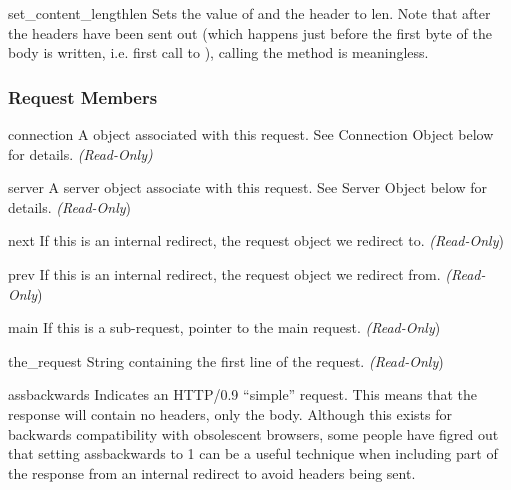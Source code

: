 \begin{methoddesc}[request]{set_content_length}{len}
  Sets the value of  and the 
  header to len. Note that after the headers have been sent out (which
  happens just before the first byte of the body is written,
  i.e. first call to ), calling the method is
  meaningless.
\end{methoddesc}


\subsubsection{Request Members\label{pyapi-mprequest-mem}}

\begin{memberdesc}[request]{connection}
  A  object associated with this request. See
  Connection Object below for details.
  \emph{(Read-Only)}
\end{memberdesc}

\begin{memberdesc}[request]{server}
  A server object associate with this request. See Server Object below
  for details.
  \emph{(Read-Only})
\end{memberdesc}

\begin{memberdesc}[request]{next}
  If this is an internal redirect, the request object we redirect to. 
  \emph{(Read-Only})
\end{memberdesc}

\begin{memberdesc}[request]{prev}
  If this is an internal redirect, the request object we redirect from.
  \emph{(Read-Only})
\end{memberdesc}

\begin{memberdesc}[request]{main}
  If this is a sub-request, pointer to the main request. 
  \emph{(Read-Only})
\end{memberdesc}

\begin{memberdesc}[request]{the_request}
  String containing the first line of the request.
  \emph{(Read-Only})
\end{memberdesc}

\begin{memberdesc}[request]{assbackwards}
  Indicates an HTTP/0.9 ``simple'' request. This means that the
  response will contain no headers, only the body. Although this
  exists for backwards compatibility with obsolescent browsers, some
  people have figred out that setting assbackwards to 1 can be a
  useful technique when including part of the response from an
  internal redirect to avoid headers being sent.
\end{memberdesc}

